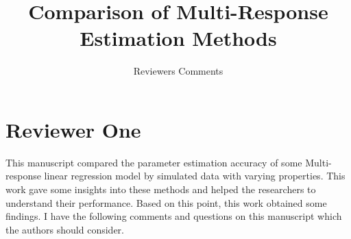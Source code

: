 \documentclass[12pt, a4paper]{scrartcl}
\title{Comparison of Multi-Response Estimation Methods}
\subtitle{Reviewers Comments}
\author{\vspace{-5ex}}
\date{\vspace{-5ex}}
\begin{document}
\maketitle

\section{Reviewer One}

This manuscript compared the parameter estimation accuracy of some Multi-response linear regression model by simulated data with varying properties. This work gave some insights into these methods and helped the researchers to understand their performance. Based on this point, this work obtained some findings. I have the following comments and questions on this manuscript which the authors should consider.
\end{document}
